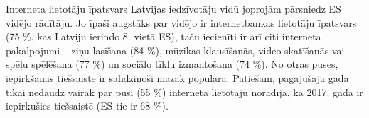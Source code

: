 Interneta lietotāju īpatsvars Latvijas iedzīvotāju vidū joprojām pārsniedz ES vidējo rādītāju.
Jo īpaši augstāks par vidējo ir internetbankas lietotāju īpatsvars (75 \%, kas Latviju ierindo 8.
vietā ES), taču iecienīti ir arī citi interneta pakalpojumi – ziņu lasīšana (84 \%), mūzikas
klausīšanās, video skatīšanās vai spēļu spēlēšana (77 \%) un sociālo tīklu izmantošana
(74 \%). No otras puses, iepirkšanās tiešsaistē ir salīdzinoši mazāk populāra. Patiešām,
pagājušajā gadā tikai nedaudz vairāk par pusi (55 \%) interneta lietotāju norādīja, ka 2017.
gadā ir iepirkušies tiešsaistē (ES tie ir 68 \%).